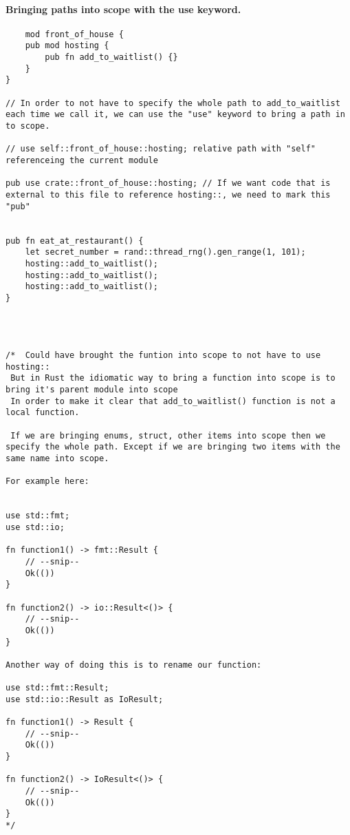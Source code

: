\paragraph*{Bringing paths into scope with the use keyword.}

\begin{lstlisting}
    mod front_of_house {
    pub mod hosting {
        pub fn add_to_waitlist() {}
    }
}

// In order to not have to specify the whole path to add_to_waitlist each time we call it, we can use the "use" keyword to bring a path in to scope.

// use self::front_of_house::hosting; relative path with "self" referenceing the current module 

pub use crate::front_of_house::hosting; // If we want code that is external to this file to reference hosting::, we need to mark this "pub"


pub fn eat_at_restaurant() {
    let secret_number = rand::thread_rng().gen_range(1, 101);
    hosting::add_to_waitlist();
    hosting::add_to_waitlist();
    hosting::add_to_waitlist();
}




/*  Could have brought the funtion into scope to not have to use hosting::
 But in Rust the idiomatic way to bring a function into scope is to bring it's parent module into scope
 In order to make it clear that add_to_waitlist() function is not a local function.

 If we are bringing enums, struct, other items into scope then we specify the whole path. Except if we are bringing two items with the same name into scope.

For example here:


use std::fmt;
use std::io;

fn function1() -> fmt::Result {
    // --snip--
    Ok(())
}

fn function2() -> io::Result<()> {
    // --snip--
    Ok(())
}

Another way of doing this is to rename our function:

use std::fmt::Result;
use std::io::Result as IoResult;

fn function1() -> Result {
    // --snip--
    Ok(())
}

fn function2() -> IoResult<()> {
    // --snip--
    Ok(())
}
*/
\end{lstlisting}
\newpage 
